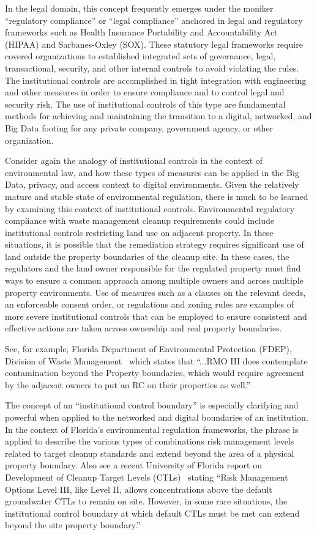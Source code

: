 In the legal domain, this concept frequently emerges under the moniker ``regulatory compliance'' or ``legal compliance'' anchored in legal and regulatory frameworks such as Health Insurance Portability and Accountability Act (HIPAA) and Sarbanes-Oxley (SOX).
These statutory legal frameworks require covered organizations to established integrated sets of governance, legal, transactional, security, and other internal controls to avoid violating the rules.
The institutional controls are accomplished in tight integration with engineering and other measures in order to ensure compliance and to control legal and security risk.
The use of institutional controls of this type are fundamental methods for achieving and maintaining the transition to a digital, networked, and Big Data footing for any private company, government agency, or other organization.

Consider again the analogy of institutional controls in the context of environmental law, and how these types of measures can be applied in the Big Data, privacy, and access context to digital environments.
Given the relatively mature and stable state of environmental regulation, there is much to be learned by examining this context of institutional controls.
Environmental regulatory compliance with waste management cleanup requirements could include institutional controls restricting land use on adjacent property.
In these situations, it is possible that the remediation strategy requires significant use of land outside the property boundaries of the cleanup site. 
In these cases, the regulators and the land owner responsible for the regulated property must find ways to ensure a common approach among multiple owners and across multiple property environments.
Use of measures such as a clauses on the relevant deeds, an enforceable consent order, or regulations and zoning rules are examples of more severe institutional controls that can be employed to ensure consistent and effective actions are taken across ownership and real property boundaries.

See, for example, Florida Department of Environmental Protection (FDEP), Division of Waste Management~\cite{FloridaEPA2012} which states that
``...RMO III does contemplate contamination beyond the Property boundaries, which would require agreement by the adjacent owners to put an RC on their properties as well.''

The concept of an ``institutional control boundary'' is especially clarifying and powerful when applied to the networked and digital boundaries of an institution.
In the context of Florida's environmental regulation frameworks, the phrase is applied to describe the various types of combinations risk management levels related to target cleanup standards and extend beyond the area of a physical property boundary.
Also see a recent University of Florida report on Development of Cleanup Target Levels (CTLs)~\cite{UFlorida2005} stating
``Risk Management Options Level III, like Level II, allows concentrations above the default groundwater CTLs to remain on site.
However, in some rare situations, the institutional control boundary at which default CTLs must be met can extend beyond the site property boundary.''

